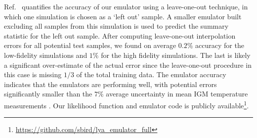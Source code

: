 Ref.~\cite{2023simsuite} quantifies the accuracy of our emulator using a leave-one-out technique, in which one simulation is chosen as a `left out' sample.
A smaller emulator built excluding all samples from this simulation is used to predict the summary statistic for the left out sample.
After computing leave-one-out interpolation errors for all potential test samples, we found on average $0.2\%$ accuracy for the low-fidelity simulations and $1\%$ for the high fidelity simulations.
The last is likely a significant over-estimate of the actual error since the leave-one-out procedure in this case is missing $1/3$ of the total training data.
The emulator accuracy indicates that the emulators are performing well, with potential errors significantly smaller than the $7\%$ average uncertainty in mean IGM temperature measurements \cite{2019JCAP...07..017C}.
Our likelihood function and emulator code is publicly available\footnote{\url{https://github.com/sbird/lya_emulator_full}}.

